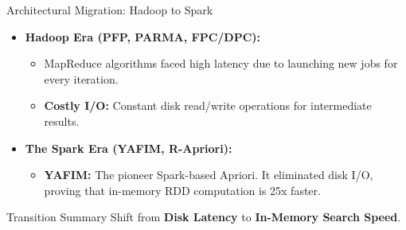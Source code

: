 \begin{frame}[t]{Architectural Migration: Hadoop to Spark}
    \begin{itemize}
        \item \textbf{Hadoop Era (PFP, PARMA, FPC/DPC):}
        \begin{itemize}
            \item \small MapReduce algorithms faced high latency due to launching new jobs for every iteration.
            \item \small \textbf{Costly I/O:} Constant disk read/write operations for intermediate results.
        \end{itemize}
        \item \textbf{The Spark Era (YAFIM, R-Apriori):}
        \begin{itemize}
            \item \small \textbf{YAFIM:} The pioneer Spark-based Apriori. It eliminated disk I/O, proving that in-memory RDD computation is 25x faster.
        \end{itemize}
    \end{itemize}

    \begin{center}
    \end{center}

    \begin{alertblock}{Transition Summary}
        \footnotesize Shift from \textbf{Disk Latency} to \textbf{In-Memory Search Speed}.
    \end{alertblock}
\end{frame}

